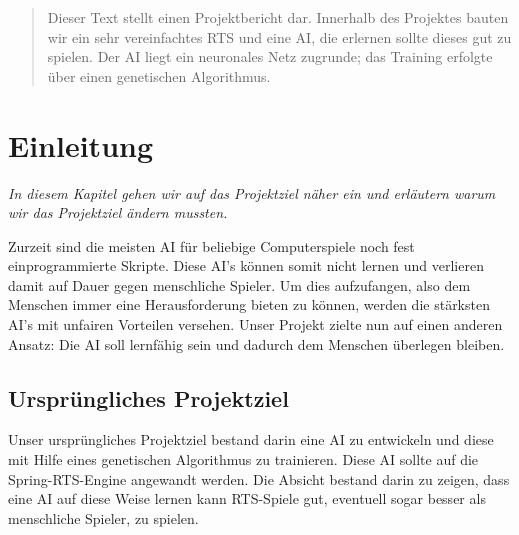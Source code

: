 \documentclass[
	12pt,
	a4paper,
	BCOR10mm,
	DIV14,
	headsepline,
	usegeometry,
]{scrreprt}
\begin{document}
\restoregeometry


\tableofcontents

\begin{abstract}

Dieser Text stellt einen Projektbericht dar. 
Innerhalb des Projektes bauten wir ein sehr vereinfachtes RTS und eine AI, die erlernen sollte dieses gut zu spielen. 
Der AI liegt ein neuronales Netz zugrunde; das Training erfolgte über einen genetischen Algorithmus.
\end{abstract}


\chapter{Einleitung}
\label{Einleitung}

\textit{%
In diesem Kapitel gehen wir auf das Projektziel näher ein und erläutern warum wir das Projektziel ändern mussten.
}

\bigskip

Zurzeit sind die meisten AI für beliebige Computerspiele noch fest einprogrammierte Skripte. Diese AI's können somit nicht lernen und verlieren damit auf Dauer gegen menschliche Spieler. Um dies aufzufangen, also dem Menschen immer eine Herausforderung bieten zu können, werden die stärksten AI's mit unfairen Vorteilen versehen. Unser Projekt zielte nun auf einen anderen Ansatz: Die AI soll lernfähig sein und dadurch dem Menschen überlegen bleiben.

\section{Ursprüngliches Projektziel}

Unser ursprüngliches Projektziel bestand darin eine AI zu entwickeln und diese mit Hilfe eines genetischen Algorithmus zu trainieren. Diese AI sollte auf die Spring-RTS-Engine \cite{spring} angewandt werden. Die Absicht bestand darin zu zeigen, dass eine AI auf diese Weise lernen kann RTS-Spiele gut, eventuell sogar besser als menschliche Spieler, zu spielen.\\
\end{document}
